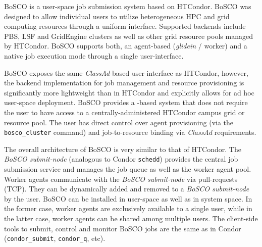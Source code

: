 \documentclass{sig-alternate}
\begin{document}
BoSCO is a user-space job submission system based on HTCondor. BoSCO was
designed to allow individual users to utilize heterogeneous HPC and grid
computing resources through a uniform interface. Supported backends include PBS,
LSF and GridEngine clusters as well as other  grid resource pools managed by
HTCondor. BoSCO supports both, an agent-based (\textit{glidein} / worker) and
a native job execution mode through a single user-interface.

BoSCO exposes the same \textit{ClassAd}-based user-interface as HTCondor,
however, the backend implementation for job management and resource provisioning
is significantly more lightweight than in HTCondor and explicitly allows for ad
hoc user-space deployment. BoSCO provides a \pilotjob-based system that does not
require the user to have access to a centrally-administered HTCondor campus grid
or  resource pool. The user has direct control over \pilotjob agent provisioning
(via the \texttt{bosco\_cluster} command) and job-to-resource binding via
\textit{ClassAd} requirements.

The overall architecture of BoSCO is very similar to that of HTCondor. The
\textit{BoSCO submit-node} (analogous to Condor \texttt{schedd}) provides the
central job submission service and manages the job queue as well as the worker
agent pool. Worker agents communicate with the \textit{BoSCO submit-node} via
pull-requests (TCP). They can be dynamically added and removed to a
\textit{BoSCO submit-node} by the user. BoSCO can be installed in user-space as
well as in system space. In the former case, worker agents are exclusively
available to a single user, while in the latter case, worker agents can be
shared among multiple users. The client-side tools to submit, control and
monitor BoSCO jobs are the same as in Condor (\texttt{condor\_submit},
\texttt{condor\_q}, etc).




\end{document}
